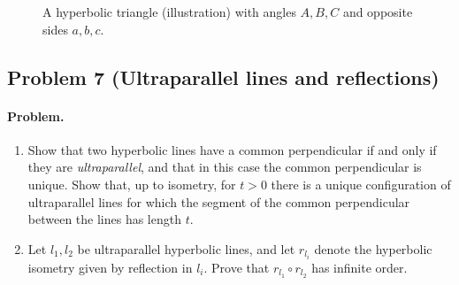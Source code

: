 \documentclass[12pt,a4paper]{article}
\theoremstyle{plain}
\theoremstyle{definition}      %
\begin{document}
\begin{figure}[ht]
		\caption{A hyperbolic triangle (illustration) with angles $A,B,C$ and opposite sides $a,b,c$.}
	\end{figure}
	
	
	
	\subsection*{Problem 7 (Ultraparallel lines and reflections)}
	\paragraph{Problem.}
	\begin{enumerate}[label=(\alph*)]
		\item Show that two hyperbolic lines have a common perpendicular if and only if they are \emph{ultraparallel},
		and that in this case the common perpendicular is unique. Show that, up to isometry, for $t>0$ there is a unique
		configuration of ultraparallel lines for which the segment of the common perpendicular between the lines has length $t$.
		\item Let $l_1,l_2$ be ultraparallel hyperbolic lines, and let $r_{l_i}$ denote the hyperbolic isometry given by reflection in $l_i$.
		Prove that $r_{l_1}\circ r_{l_2}$ has infinite order.
	\end{enumerate}
	
	
\end{document}
